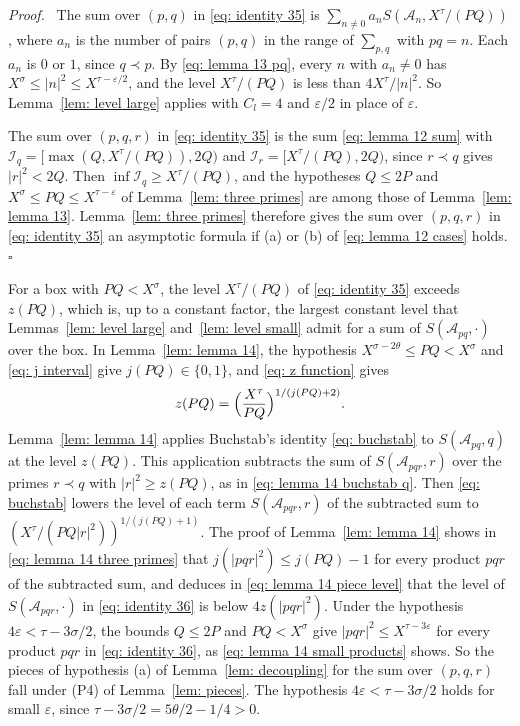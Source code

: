 \documentclass{article}
\numberwithin{equation}{section}
\newenvironment{proof}[1][Proof]{\par\medskip\noindent\textit{#1.}\ }{\hfill$\square$\par\medskip}
\newcommand{\Le}{\leqslant}
\newcommand{\Ge}{\geqslant}
\begin{document}
\begin{proof}
The sum over $(p, q)$ in \eqref{eq: identity 35} is $\sum_{n \neq 0} a_n S(\mathcal{A}_n, X^{\tau}/(PQ))$, where $a_n$ is the number of pairs $(p, q)$ in the range of $\sum_{p, q}$ with $pq = n$. Each $a_n$ is $0$ or $1$, since $q \prec p$. By \eqref{eq: lemma 13 pq}, every $n$ with $a_n \neq 0$ has $X^{\sigma} \Le |n|^2 \Le X^{\tau - \varepsilon/2}$, and the level $X^{\tau}/(PQ)$ is less than $4X^{\tau}/|n|^2$. So Lemma~\ref{lem: level large} applies with $C_l = 4$ and $\varepsilon/2$ in place of $\varepsilon$.

The sum over $(p, q, r)$ in \eqref{eq: identity 35} is the sum \eqref{eq: lemma 12 sum} with $\mathcal{I}_q = [\max(Q, X^{\tau}/(PQ)), 2Q)$ and $\mathcal{I}_r = [X^{\tau}/(PQ), 2Q)$, since $r \prec q$ gives $|r|^2 < 2Q$. Then $\inf \mathcal{I}_q \Ge X^{\tau}/(PQ)$, and the hypotheses $Q \Le 2P$ and $X^{\sigma} \Le PQ \Le X^{\tau - \varepsilon}$ of Lemma~\ref{lem: three primes} are among those of Lemma~\ref{lem: lemma 13}. Lemma~\ref{lem: three primes} therefore gives the sum over $(p, q, r)$ in \eqref{eq: identity 35} an asymptotic formula if (a) or (b) of \eqref{eq: lemma 12 cases} holds.
\end{proof}

For a box with $PQ < X^{\sigma}$, the level $X^{\tau}/(PQ)$ of \eqref{eq: identity 35} exceeds $z(PQ)$, which is, up to a constant factor, the largest constant level that Lemmas~\ref{lem: level large} and~\ref{lem: level small} admit for a sum of $S(\mathcal{A}_{pq}, \cdot)$ over the box. In Lemma~\ref{lem: lemma 14}, the hypothesis $X^{\sigma - 2\theta} \Le PQ < X^{\sigma}$ and \eqref{eq: j interval} give $j(PQ) \in \{0, 1\}$, and \eqref{eq: z function} gives
\begin{equation*}
z(PQ) = \Bigl( \frac{X^{\tau}}{PQ} \Bigr)^{1/(j(PQ)+2)}.
\end{equation*}
Lemma~\ref{lem: lemma 14} applies Buchstab's identity \eqref{eq: buchstab} to $S(\mathcal{A}_{pq}, q)$ at the level $z(PQ)$. This application subtracts the sum of $S(\mathcal{A}_{pqr}, r)$ over the primes $r \prec q$ with $|r|^2 \Ge z(PQ)$, as in \eqref{eq: lemma 14 buchstab q}. Then \eqref{eq: buchstab} lowers the level of each term $S(\mathcal{A}_{pqr}, r)$ of the subtracted sum to $(X^{\tau}/(PQ|r|^2))^{1/(j(PQ)+1)}$. The proof of Lemma~\ref{lem: lemma 14} shows in \eqref{eq: lemma 14 three primes} that $j(|pqr|^2) \Le j(PQ) - 1$ for every product $pqr$ of the subtracted sum, and deduces in \eqref{eq: lemma 14 piece level} that the level of $S(\mathcal{A}_{pqr}, \cdot)$ in \eqref{eq: identity 36} is below $4z(|pqr|^2)$. Under the hypothesis $4\varepsilon < \tau - 3\sigma/2$, the bounds $Q \Le 2P$ and $PQ < X^{\sigma}$ give $|pqr|^2 \Le X^{\tau - 3\varepsilon}$ for every product $pqr$ in \eqref{eq: identity 36}, as \eqref{eq: lemma 14 small products} shows. So the pieces of hypothesis (a) of Lemma~\ref{lem: decoupling} for the sum over $(p, q, r)$ fall under (P4) of Lemma~\ref{lem: pieces}. The hypothesis $4\varepsilon < \tau - 3\sigma/2$ holds for small $\varepsilon$, since $\tau - 3\sigma/2 = 5\theta/2 - 1/4 > 0$.
\end{document}
